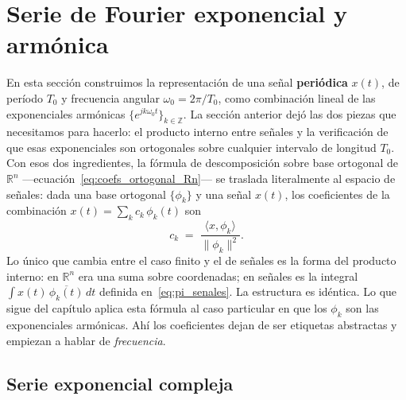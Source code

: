 \documentclass[class=book, crop=false]{standalone}
\begin{document}
\setcounter{chapter}{5}
\section{Serie de Fourier exponencial y armónica}
\label{sec:serie_fourier}

En esta sección construimos la representación de una señal
\textbf{periódica} $x(t)$, de período $T_0$ y frecuencia angular
$\omega_0 = 2\pi/T_0$, como combinación lineal de las exponenciales
armónicas $\{e^{jk\omega_0 t}\}_{k\in\mathbb{Z}}$. La sección anterior
dejó las dos piezas que necesitamos para hacerlo: el producto interno
entre señales y la verificación de que esas exponenciales son
ortogonales sobre cualquier intervalo de longitud $T_0$. Con esos dos
ingredientes, la fórmula de descomposición sobre base ortogonal de
$\mathbb{R}^n$ ---ecuación~\eqref{eq:coefs_ortogonal_Rn}--- se traslada
literalmente al espacio de señales: dada una base ortogonal
$\{\phi_k\}$ y una señal $x(t)$, los coeficientes de la combinación
$x(t) = \sum_k c_k\,\phi_k(t)$ son
\begin{equation}
    c_k \;=\; \frac{\langle x,\phi_k\rangle}{\|\phi_k\|^2}.
    \label{eq:coefs_generalizados}
\end{equation}
Lo único que cambia entre el caso finito y el de señales es la forma
del producto interno: en $\mathbb{R}^n$ era una suma sobre coordenadas;
en señales es la integral $\int x(t)\,\overline{\phi_k(t)}\,dt$
definida en~\eqref{eq:pi_senales}. La estructura es idéntica. Lo que
sigue del capítulo aplica esta fórmula al caso particular en que los
$\phi_k$ son las exponenciales armónicas. Ahí los coeficientes dejan
de ser etiquetas abstractas y empiezan a hablar de \emph{frecuencia}.

\subsection{Serie exponencial compleja}
\label{subsec:serie_exp_compleja}
\end{document}
